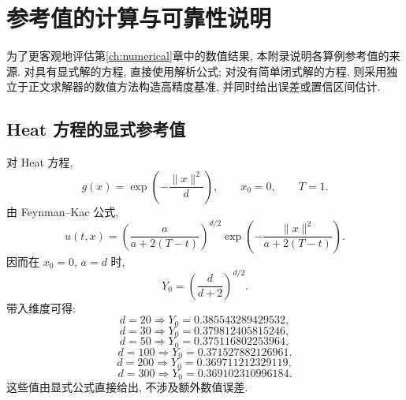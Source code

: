
\chapter{参考值的计算与可靠性说明}\label{ch:reference_values}
  为了更客观地评估第\ref{ch:numerical}章中的数值结果, 本附录说明各算例参考值的来源.
  对具有显式解的方程, 直接使用解析公式;
  对没有简单闭式解的方程, 则采用独立于正文求解器的数值方法构造高精度基准,
  并同时给出误差或置信区间估计.

  \section{Heat 方程的显式参考值}\label{sec:ref_heat}
    对 Heat 方程,
    \begin{equation}
      g(x)=\exp\!\left(-\frac{\lVert x\rVert^2}{d}\right),
      \qquad x_0=0,\qquad T=1.
    \end{equation}
    由 Feynman--Kac 公式,
    \begin{equation}
      u(t,x)
      =
      \left(\frac{a}{a+2(T-t)}\right)^{d/2}
      \exp\!\left(
              -\frac{\lVert x\rVert^2}{a+2(T-t)}
      \right).
      \label{eq:numerical_heat_solution}
    \end{equation}
    因而在 $x_0=0$, $a=d$ 时,
    \begin{equation}
      Y_0 = \left(\frac{d}{d+2}\right)^{d/2}.
    \end{equation}
    带入维度可得:
    \begin{equation}
      d=20 \Rightarrow Y_0=0.385543289429532,
    \end{equation}
    \begin{equation}
      d=30 \Rightarrow Y_0=0.379812405815246,
    \end{equation}
    \begin{equation}
      d=50 \Rightarrow Y_0=0.375116802253964,
    \end{equation}
    \begin{equation}
      d=100 \Rightarrow Y_0=0.371527882126961.
    \end{equation}
    \begin{equation}
      d=200 \Rightarrow Y_0=0.369711212329119,
    \end{equation}
    \begin{equation}
      d=300 \Rightarrow Y_0=0.369102310996184.
    \end{equation}
    这些值由显式公式直接给出, 不涉及额外数值误差.

